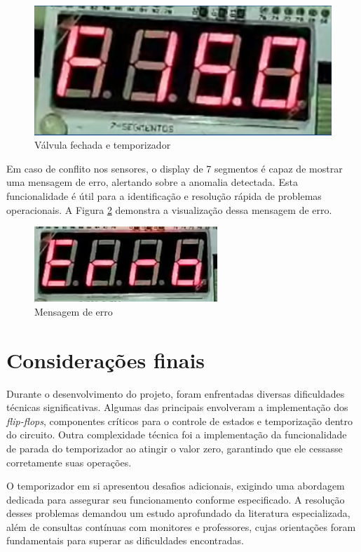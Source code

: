 \documentclass[
	article,			%
	11pt,				%
	oneside,			%
	a4paper,			%
	english,			%
	brazil,				%
	sumario=tradicional
	]{abntex2}
\begin{document}
\begin{figure} [H]
    \centering
    \includegraphics[width=0.4\linewidth]{valv-fechada.png}
    \caption{Válvula fechada e temporizador}
    \label{fig:valv-fechada}
\end{figure}

Em caso de conflito nos sensores, o display de 7 segmentos é capaz de mostrar uma mensagem de erro, alertando sobre a anomalia detectada. Esta funcionalidade é útil para a identificação e resolução rápida de problemas operacionais. A Figura \ref{fig:erro} demonstra a visualização dessa mensagem de erro.

\begin{figure} [H]
    \centering
    \includegraphics[width=0.4\linewidth]{erro.png}
    \caption{Mensagem de erro}
    \label{fig:erro}
\end{figure}



% 

\section*{Considerações finais}

Durante o desenvolvimento do projeto, foram enfrentadas diversas dificuldades técnicas significativas. Algumas das principais envolveram a implementação dos \textit{flip-flops}, componentes críticos para o controle de estados e temporização dentro do circuito. Outra complexidade técnica foi a implementação da funcionalidade de parada do temporizador ao atingir o valor zero, garantindo que ele cessasse corretamente suas operações.

O temporizador em si apresentou desafios adicionais, exigindo uma abordagem dedicada para assegurar seu funcionamento conforme especificado. A resolução desses problemas demandou um estudo aprofundado da literatura especializada, além de consultas contínuas com monitores e professores, cujas orientações foram fundamentais para superar as dificuldades encontradas.
\end{document}
